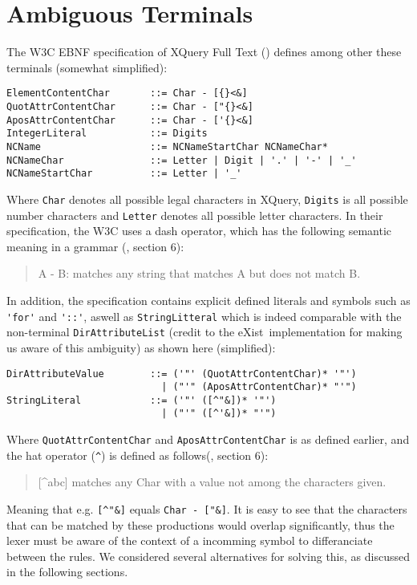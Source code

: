 \section{Ambiguous Terminals}
\label{sect:ambiguousgrammar:ambigTerm}
The W3C EBNF specification of XQuery Full Text (\cite{w3c01}) defines among other these terminals (somewhat simplified):
\begin{verbatim}
ElementContentChar       ::= Char - [{}<&]
QuotAttrContentChar      ::= Char - ["{}<&]
AposAttrContentChar      ::= Char - ['{}<&]
IntegerLiteral           ::= Digits
NCName                   ::= NCNameStartChar NCNameChar*
NCNameChar               ::= Letter | Digit | '.' | '-' | '_'
NCNameStartChar          ::= Letter | '_'
\end{verbatim}
Where \verb!Char! denotes all possible legal characters in XQuery, \verb!Digits! is all possible number characters and \verb!Letter! denotes all possible letter characters. In their specification, the W3C uses a dash operator, which has the following
semantic meaning in a grammar (\cite{w3c03}, section 6):
\begin{quote}
A - B: matches any string that matches A but does not match B.
\end{quote}
In addition, the specification contains explicit defined literals and symbols such as \verb!'for'! and \verb!'::'!, aswell as \verb!StringLitteral! which is indeed comparable with the non-terminal \verb!DirAttributeList! (credit to the eXist\cite{exist_doc}~implementation for making us aware of this ambiguity) as shown here (simplified):
\begin{verbatim}
DirAttributeValue        ::= ('"' (QuotAttrContentChar)* '"')
                           | ("'" (AposAttrContentChar)* "'")
StringLiteral            ::= ('"' ([^"&])* '"') 
                           | ("'" ([^'&])* "'")
\end{verbatim}
Where \verb!QuotAttrContentChar! and \verb!AposAttrContentChar! is as defined earlier, and the hat operator (\verb!^!) is defined as follows(\cite{w3c03}, section 6):
\begin{quote}
[\^{}abc] matches any Char with a value not among the characters given.
\end{quote}
Meaning that e.g. \verb![^"&]! equals \verb!Char - ["&]!. It is easy to see that the characters that can be matched by these productions would overlap significantly, thus the lexer must be aware of the context of a incomming symbol to differanciate between the rules. We considered several alternatives for solving this, as discussed in the following sections.

